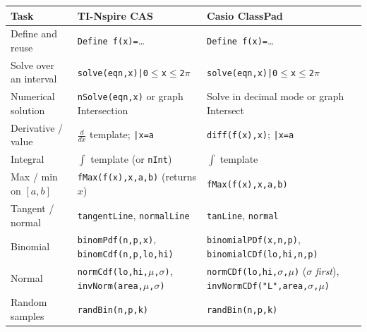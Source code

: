\begin{cas}
\small
\begin{tabularx}{\linewidth}{@{}p{3.6cm}LL@{}}
\toprule
Task & TI-Nspire CAS & Casio ClassPad \\
\midrule
Define and reuse & \texttt{Define f(x)=}\dots & \texttt{Define f(x)=}\dots \\
Solve over an interval & \texttt{solve(eqn,x)|0$\le$x$\le$2$\pi$} & \texttt{solve(eqn,x)|0$\le$x$\le$2$\pi$} \\
Numerical solution & \texttt{nSolve(eqn,x)} or graph \textsf{Intersection} & Solve in decimal mode or graph \textsf{Intersect} \\
Derivative / value & $\frac{d}{dx}$ template; \texttt{|x=a} & \texttt{diff(f(x),x)}; \texttt{|x=a} \\
Integral & $\int$ template (or \texttt{nInt}) & $\int$ template \\
Max / min on $[a,b]$ & \texttt{fMax(f(x),x,a,b)} (returns $x$) & \texttt{fMax(f(x),x,a,b)} \\
Tangent / normal & \texttt{tangentLine}, \texttt{normalLine} & \texttt{tanLine}, \texttt{normal} \\
Binomial & \texttt{binomPdf(n,p,x)}, \texttt{binomCdf(n,p,lo,hi)} & \texttt{binomialPDf(x,n,p)}, \texttt{binomialCDf(lo,hi,n,p)} \\
Normal & \texttt{normCdf(lo,hi,$\mu$,$\sigma$)}, \texttt{invNorm(area,$\mu$,$\sigma$)} & \texttt{normCDf(lo,hi,$\sigma$,$\mu$)} ($\sigma$ \emph{first}), \texttt{invNormCDf("L",area,$\sigma$,$\mu$)} \\
Random samples & \texttt{randBin(n,p,k)} & \texttt{randBin(n,p,k)} \\
\bottomrule
\end{tabularx}
\end{cas}

